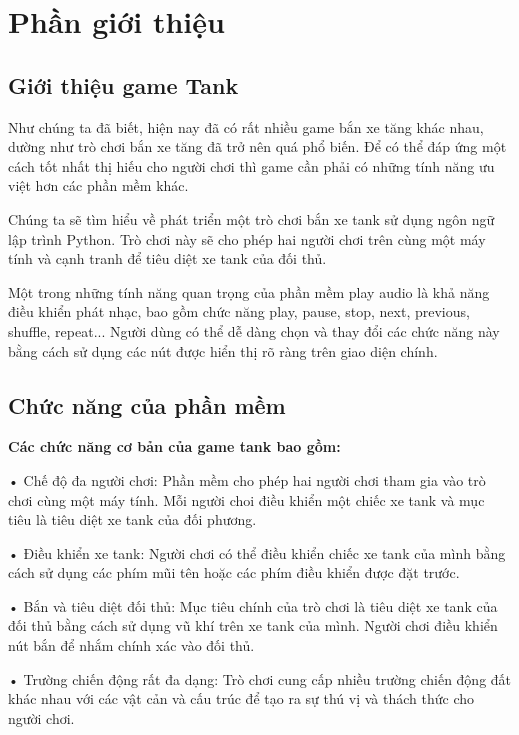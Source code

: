 \documentclass[a4paper]{article}
\begin{document}
\thispagestyle{empty}

\newpage
\tableofcontents
\newpage



\section{Phần giới thiệu}
	\subsection{ Giới thiệu game Tank}

 
	Như chúng ta đã biết, hiện nay đã có rất nhiều game bắn xe tăng khác nhau, dường như trò chơi bắn xe tăng đã trở nên quá phổ biến. Để có thể đáp ứng một cách tốt nhất thị hiếu cho người chơi thì game cần phải có những tính năng ưu việt hơn các phần mềm khác.

	Chúng ta sẽ tìm hiểu về phát triển một trò chơi bắn xe tank sử dụng ngôn ngữ lập trình Python. Trò chơi này sẽ cho phép hai người chơi trên cùng một máy tính và cạnh tranh để tiêu diệt xe tank của đối thủ.

	Một trong những tính năng quan trọng của phần mềm play audio là khả năng điều khiển phát nhạc, bao gồm chức năng play, pause, stop, next, previous, shuffle, repeat... Người dùng có thể dễ dàng chọn và thay đổi các chức năng này bằng cách sử dụng các nút được hiển thị rõ ràng trên giao diện chính.


	\subsection{Chức năng của phần mềm}
	\textbf{ Các chức năng cơ bản của game tank bao gồm:}

	•	Chế độ đa người chơi: Phần mềm cho phép hai người chơi tham gia vào trò chơi cùng một máy tính. Mỗi người choi điều khiển một chiếc xe tank và mục tiêu là tiêu diệt xe tank của đối phương.

	•	Điều khiển xe tank: Người chơi có thể điều khiển chiếc xe tank của mình bằng cách sử dụng các phím mũi tên hoặc các phím điều khiển được đặt trước.

	•	Bắn và tiêu diệt đối thủ: Mục tiêu chính của trò chơi là tiêu diệt xe tank của đối thủ bằng cách sử dụng vũ khí trên xe tank của mình. Người chơi điều khiển nút bắn để nhắm chính xác vào đối thủ.

	•	Trường chiến động rất đa dạng: Trò chơi cung cấp nhiều trường chiến động đất khác nhau với các vật cản và cấu trúc để tạo ra sự thú vị và thách thức cho người chơi.
\end{document}
